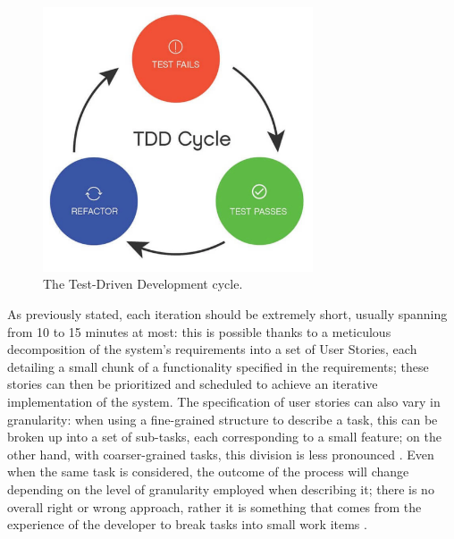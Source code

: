 \begin{figure}[h]
    \centering
    \includegraphics[width=8cm, scale=0.2]{figures/tdd_cycle.jpg}
    \caption{The Test-Driven Development cycle.}
    \label{tdd-cycle}
\end{figure}

As previously stated, each \tdd iteration should be extremely short, usually spanning from 10 to 15 minutes at most: this is possible thanks to a meticulous decomposition of the system's requirements into a set of User Stories, each detailing a small chunk of a functionality specified in the requirements; these stories can then be prioritized and scheduled to achieve an iterative implementation of the system. The specification of user stories can also vary in granularity: when using a fine-grained structure to describe a task, this can be broken up into a set of sub-tasks, each corresponding to a small feature; on the other hand, with coarser-grained tasks, this division is less pronounced \cite{DBLP:journals/tse/KaracTJ21}. Even when the same task is considered, the outcome of the \tdd process will change depending on the level of granularity employed when describing it; there is no overall right or wrong approach, rather it is something that comes from the experience of the developer to break tasks into small work items \cite{DBLP:journals/tse/KaracTJ21}.


